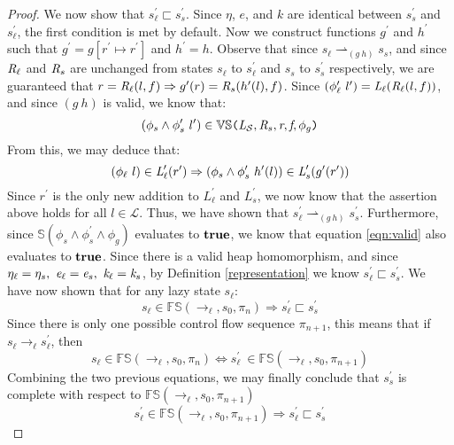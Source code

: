 \begin{proof}
We now show that $s_\ell^\prime \sqsubset s_s^\prime$. Since $\eta$, $e$, and $k$ are identical between $s_s^\prime$ and $s_\ell^\prime $, the first condition is met by default. Now we construct functions $g^\prime$ and $h^\prime$ such that $g^\prime = g[ r^\prime \mapsto r^\prime]$ and $h^\prime = h$. Observe that since $s_\ell \rightharpoonup_{(g\ h)} s_s$, and since $\emph{R}_\ell$ and $\emph{R}_s$ are unchanged from states $s_\ell$ to $s_\ell^\prime$ and $s_s$ to $s_s^\prime$ respectively, we are guaranteed that $ r = \emph{R}_\ell(l,f) \Rightarrow g^\prime(r) = \emph{R}_s(h^\prime(l),f)$. Since $(\phi_\ell^\prime\ l^\prime) =  \emph{L}_\ell(\emph{R}_\ell(l,f))$, and since $(g\ h)$ is valid, we know that:
 $$(\phi_s \wedge \phi_s^\prime\ l^\prime) \in \mathbb{VS}\texttt{(} \emph{L}_{\mathcal{S}},\emph{R}_{s},\emph{r},\emph{f},\phi_g\texttt{)}$$ 
From this, we may deduce that:
$$ (\phi_\ell\ l) \in \cfgnt{L}_\ell^\prime(r^\prime) \Rightarrow (\phi_s \wedge \phi_s^\prime\ h^\prime(l))\in \cfgnt{L}_s^\prime(g^\prime(r^\prime))$$
Since $r^\prime$ is the only new addition to $L_\ell^\prime$ and $L_s^\prime$, we now know that the assertion above holds for all $l \in \mathcal{L}$. Thus, we have shown that $s_\ell^\prime \rightharpoonup_{(g\ h)} s_s^\prime$. Furthermore, since $\mathbb{S}(\phi_s\wedge\phi_s^\prime\wedge \phi_g)$ evaluates to $\textbf{true}$, we know that equation \ref{eqn:valid} also evaluates to $\textbf{true}$. Since there is a valid heap homomorphism, and since $\eta_{\ell} = \eta_{s} ,\ \emph{e}_{\ell} = \emph{e}_{s} ,\ \emph{k}_{\ell} = \emph{k}_{s}$, by Definition \ref{representation} we know $s_\ell^\prime \sqsubset s_s^\prime$. We have now shown that for any lazy state $s_\ell$: 
$$s_\ell \in \mathbb{FS}(\rightarrow_{\ell},s_0,\pi_n) \Rightarrow s_\ell^\prime \sqsubset s_s^\prime$$
Since there is only one possible control flow sequence $\pi_{n+1}$, this means that if $s_\ell \rightarrow_\ell s_\ell^\prime$, then $$s_\ell \in \mathbb{FS}(\rightarrow_{\ell},s_0,\pi_n) \Leftrightarrow s_\ell^\prime\ \in \mathbb{FS}(\rightarrow_{\ell},s_0,\pi_{n+1})$$
Combining the two previous equations, we may finally conclude that $s_s^\prime$ is complete with respect to $\mathbb{FS}(\rightarrow_{\ell},s_0,\pi_{n+1})$
\begin{equation}
\label{eqn:readforwards}
s_\ell^\prime \in \mathbb{FS}(\rightarrow_{\ell},s_0,\pi_{n+1}) \Rightarrow s_\ell^\prime \sqsubset s_s^\prime
\end{equation}


\end{proof}
